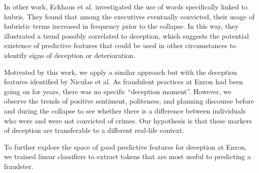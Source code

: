 In other work, Eckhaus et al. \cite{hubris} investigated the use of words specifically linked to hubris. They found that among the executives eventually convicted, their usage of hubristic terms increased in frequency prior to the collapse. In this way, they illustrated a trend possibly correlated to deception, which suggests the potential existence of predictive features that could be used in other circumstances to identify signs of deception or deterioration. 


Motivated by this work, we apply a similar approach but with the deception features identified by Niculae et al. As fraudulent practices at Enron had been going on for years, there was no specific ``deception moment''. However, we observe the trends of positive sentiment, politeness, and planning discourse before and during the collapse to see whether there is a difference between individuals who were and were not convicted of crimes. Our hypothesis is that these markers of deception are transferable to a different real-life context. 

To further explore the space of good predictive features for deception at Enron, we trained linear classifiers to extract tokens that are most useful to predicting a fraudster. 
